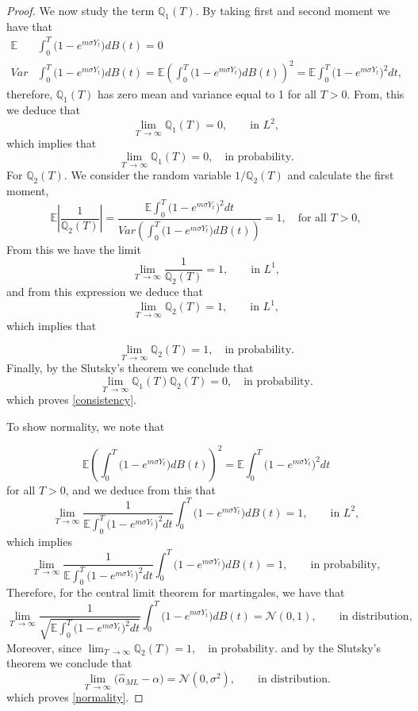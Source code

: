 \documentclass[12pt, reqno]{amsart}
\newcommand{\Q}{\mathbb Q}
\newcommand{\E}{\mathbb E}
\newcommand{\1}{{\bf 1}}
\newcommand{\2}{{\bf 2}}
\theoremstyle{definition}
\theoremstyle{remark}
\numberwithin{equation}{section}
\begin{document}
\begin{proof}
We now study the term $\Q_1(T)$. By taking first and second moment we have that 
\begin{align*}
\E& \int_0^T  \big( 1-e^{m\sigma Y_t} \big)  dB(t) =0\\
Var&\int_0^T  \big( 1-e^{m\sigma Y_t} \big)  dB(t)=\E \left( \int_0^T  \big( 1-e^{m\sigma Y_t} \big)  dB(t) \right)^2 = \E \int_0^T  \big( 1-e^{m\sigma Y_t} \big)^2  dt,
\end{align*}
therefore, $\Q_1(T)$ has zero mean and variance equal to 1 for all $T>0$. From, this we deduce that 
$$
\lim_{T\ \rightarrow \infty} \Q_1(T) = 0, \qquad \mbox {in } L^2,
$$
which implies that 
$$
\lim_{T\ \rightarrow \infty} \Q_1(T) = 0, \quad \mbox {in probability}.
$$
For $\Q_2(T)$. We consider the random variable $1/\Q_2(T)$ and calculate the first moment,
$$
\E\left|\frac{1}{\Q_2(T)} \right| = \frac{\E \int_0^T  \big( 1-e^{m\sigma Y_t} \big)^2  dt }{{Var\left(\int_0^T  \big( 1-e^{m\sigma Y_t} \big) dB(t) \right)  } } = 1 , \quad \mbox {for all } T>0,
$$
From this we have the limit  
$$ 
\lim_{T\ \rightarrow \infty} \frac{1}{\Q_2(T)} = 1,  \qquad \mbox {in } L^1,
$$
and from this expression we deduce that
$$ 
\lim_{T\ \rightarrow \infty} \Q_2(T) = 1,  \qquad \mbox {in } L^1,
$$
which implies that 

$$
\lim_{T\ \rightarrow \infty} \Q_2(T) = 1, \quad \mbox {in probability}.
$$
Finally, by the Slutsky's theorem we conclude that 
$$
\lim_{T\ \rightarrow \infty} \Q_1(T) \Q_2(T) = 0, \quad \mbox {in probability}.
$$
which proves \eqref{consistency}.

To show normality, we note that 

$$
\E\left(\int_0^T  \big( 1-e^{m\sigma Y_t} \big)  dB(t) \right)^2= \E\int_0^T  \big( 1-e^{m\sigma Y_t}   \big)^2 dt 
$$
for all $T>0$, and we deduce from this that
$$
\lim_{T \rightarrow \infty} \frac{1}{\E\int_0^T  \big(1-e^{m\sigma Y_t} \big) ^2dt } \int_0^T  \big( 1-e^{m\sigma Y_t} \big)  dB(t)  = 1, \qquad \mbox {in } L^2 ,
$$
which implies 
$$
\lim_{T\ \rightarrow \infty}  \frac{1 }{ \E\int_0^T  \big( 1-e^{m\sigma Y_t} \big)^2 dt  } \int_0^T  \big( 1-e^{m\sigma Y_t} \big)  dB(t)  = 1, \qquad \mbox {in probability},
$$
Therefore, for the central limit theorem for martingales, we have that 
$$
\lim_{T\ \rightarrow \infty}  \frac{1 }{\sqrt{ \E\int_0^T  \big( 1-e^{m\sigma Y_t}\big)^2 dt }  } \int_0^T  \big( 1-e^{m\sigma Y_t} \big)  dB(t)  = \mathcal{N}(0,1), \qquad \mbox {in distribution},
$$
Moreover, since 
$
\lim_{T\ \rightarrow \infty} \Q_2(T) = 1, \quad \mbox {in probability}.
$
and by the Slutsky's theorem we conclude that 
$$
\lim_{T\ \rightarrow \infty} \big( \hat{\alpha}_{ML} - \alpha \big ) = \mathcal{N}(0,\sigma^2), \qquad \mbox {in distribution}.
$$
which proves \eqref{normality}.
\end{proof}
\end{document}
